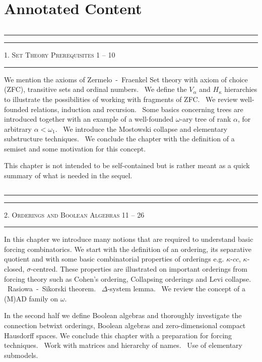 \section*{Annotated Content}


${}$\\[-0.1cm] \hrule\hrule
${}$\\[0.2cm]
{\scshape 1. Set Theory Prerequisites \hfill 1 -- 10 } \\[-0.3cm]
\hrule
${}$\\[-0.1cm]

\noindent We mention the axioms of Zermelo~-~Fraenkel Set theory with
axiom of choice (ZFC), transitive sets and ordinal numbers. \ We define
the $V_\alpha$ and $H_\kappa$ hierarchies to illustrate the possibilities of
working with fragments of ZFC. \ We review well-founded relations, induction
and recursion. \ Some basics concerning trees are introduced
together with an example of a well-founded $\omega$-ary tree of rank
$\alpha$, for arbitrary $\alpha < \omega_1$. \ We introduce
the Mostowski collapse and elementary substructure techniques. \ We conclude
the chapter with the definition of a semiset and some motivation for this
concept.

\smallskip

\noindent This chapter is not intended to be self-contained but is rather
meant as a quick summary of what is needed in the sequel.

${}$\\[-0.1cm] \hrule\hrule
${}$\\[0.2cm]
{\scshape 2. Orderings and Boolean Algebras \hfill 11 -- 26 } \\[-0.3cm]
\hrule
${}$\\[-0.1cm]

\noindent In this chapter we introduce many notions that are required to
understand basic forcing combinatorics. We start with the definition of an ordering,
its separative quotient and with some basic combinatorial properties of orderings
e.g. $\kappa$-$cc$, $\kappa$-closed, $\sigma$-centred. These
properties are illustrated on important orderings from forcing
theory such as Cohen's ordering, Collapsing orderings and Levi collapse. \
Rasiowa~-~Sikorski theorem. \ $\Delta$-system lemma. \ We review the
concept of a (M)AD family on $\omega$.

\smallskip

\noindent In the second half we define Boolean algebras and thoroughly investigate
the connection betwixt orderings, Boolean algebras and zero-dimensional
compact Hausdorff spaces. We conclude this chapter with a preparation for
forcing techniques. \ Work with matrices and hierarchy of names. \
Use of elementary submodels.

